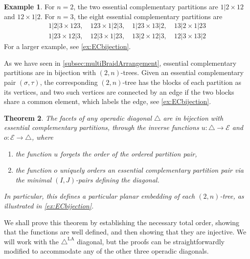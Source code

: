 \documentclass{amsart}
\newtheorem{theorem}{Theorem}[section]
\theoremstyle{definition}
\newtheorem{example}[theorem]{Example}
\newcommand{\LAD}{\triangle^{\mathrm{LA}}}
\newcommand{\EC}{\mathcal{E}} %
\newcommand{\OP}{\triangle} %
\begin{document}
\begin{example}
For $n=2$, the two essential complementary partitions are $1|2 \times 12$ and $12 \times 1|2$. For $n=3$, the eight essential complementary partitions are
\begin{align*}
	1|2|3 \times 123,\quad 
	123 \times 1|2|3,\quad 
	1|23 \times 13|2,\quad 
	13|2 \times 1|23\\
	1|23 \times 12|3,\quad 
	12|3 \times 1|23,\quad 
	13|2 \times 12|3,\quad 
	12|3 \times 13|2
\end{align*}
For a larger example, see \cref{ex:ECbijection}. 
\end{example}


As we have seen in \cref{subsec:multiBraidArrangement}, essential complementary partitions are in bijection with $(2,n)$-trees.
Given an essential complementary pair $(\sigma,\tau)$, the corresponding $(2,n)$-tree has the blocks of each partition as its vertices, and two such vertices are connected by an edge if the two blocks share a common element, which labels the edge, see \cref{ex:ECbijection}.


\begin{theorem}
\label{thm:facets}
The facets of any operadic diagonal $\OP$ are in bijection with essential complementary partitions, through the inverse functions $u:\OP \to \EC$ and $o:\EC\to \OP$, where
\begin{enumerate}
    \item the function $u$ forgets the order of the ordered partition pair,
    \item the function $o$ uniquely orders an essential complementary partition pair via the minimal $(I,J)$-pairs defining the diagonal. 
\end{enumerate}
In particular, this defines a particular planar embedding of each $(2,n)$-tree, as illustrated in \cref{ex:ECbijection}.
\end{theorem}

We shall prove this theorem by establishing the necessary total order, showing that the functions are well defined, and then showing that they are injective.
We will work with the $\LAD$ diagonal, but the proofs can be straightforwardly modified to accommodate any of the other three operadic diagonals. 
\end{document}
